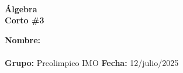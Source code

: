 \begin{center}
    \ \\
    \vspace{-1mm}
    \textbf{\Large Álgebra \\ \vspace{2mm}Corto \#3}
\end{center}
\vspace{6mm}
\textbf{Nombre:} \hrulefill\\
\vspace{-2mm}\\
\textbf{Grupo:} Preolimpico IMO \hfill \textbf{Fecha:} 12/julio/2025\\
\vspace{-8mm}
\thispagestyle{first-page-style}